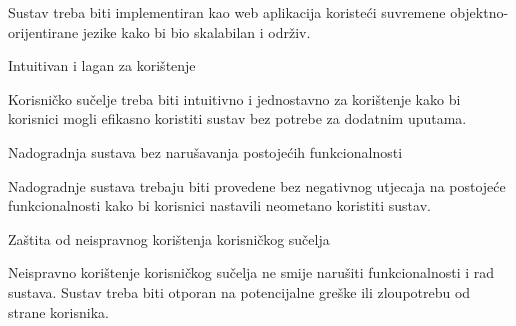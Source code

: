 \begin{packed_enum}
                    \begin{packed_item}
                        \item Sustav treba biti implementiran kao web aplikacija koristeći suvremene objektno-orijentirane jezike kako bi bio skalabilan i održiv.
                    \end{packed_item}
                 \large \item Intuitivan i lagan za korištenje \normalsize
                    \begin{packed_item}
                        \item Korisničko sučelje treba biti intuitivno i jednostavno za korištenje kako bi korisnici mogli efikasno koristiti sustav bez potrebe za dodatnim uputama.
                    \end{packed_item}
                 \large \item Nadogradnja sustava bez narušavanja postojećih funkcionalnosti \normalsize
                    \begin{packed_item}
                        \item Nadogradnje sustava trebaju biti provedene bez negativnog utjecaja na postojeće funkcionalnosti kako bi korisnici nastavili neometano koristiti sustav.
                    \end{packed_item}
                 \large \item Zaštita od neispravnog korištenja korisničkog sučelja \normalsize
                    \begin{packed_item}
                        \item Neispravno korištenje korisničkog sučelja ne smije narušiti funkcionalnosti i rad sustava. Sustav treba biti otporan na potencijalne greške ili zloupotrebu od strane korisnika.
                    \end{packed_item}
                    
				
			\end{packed_enum}
			 
			 
			 
	
